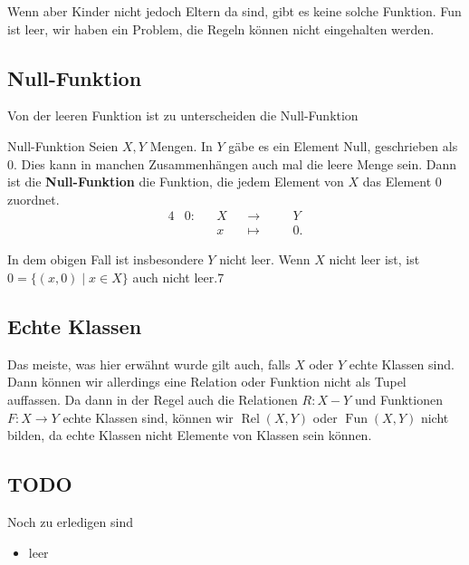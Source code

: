 \documentclass[a4paper]{amsart}
\theoremstyle{definition}
\begin{document}
Wenn aber Kinder nicht jedoch Eltern da sind, gibt es keine solche Funktion. Fun ist leer, wir haben ein Problem, die Regeln können nicht eingehalten werden.

\subsection*{Null-Funktion}
Von der leeren Funktion ist zu unterscheiden die Null-Funktion
\begin{Definition}{Null-Funktion}
   Seien $X, Y$ Mengen. In $Y$ gäbe es ein Element Null, geschrieben als $0$. Dies kann in manchen Zusammenhängen auch mal die leere Menge sein. Dann ist die \textbf{Null-Funktion} die Funktion, die jedem Element von $X$ das Element $0$ zuordnet.
   \begin{alignat}{4}
      &0 \colon &&X &&\to     &&\quad Y\\
      &         &&x &&\mapsto &&\quad 0.
   \end{alignat}
\end{Definition}
In dem obigen Fall ist insbesondere $Y$ nicht leer. Wenn $X$ nicht leer ist, ist $0 = \{(x,0) \mid x \in X \}$ auch nicht leer.7

\subsection*{Echte Klassen}
Das meiste, was hier erwähnt wurde gilt auch, falls $X$ oder $Y$ echte Klassen sind. Dann können wir allerdings eine Relation oder Funktion nicht als Tupel auffassen. Da dann in der Regel auch die Relationen $R \colon X-Y$  und Funktionen $F \colon X \to Y$ echte Klassen sind, können wir $\operatorname{Rel}(X,Y)$ oder $\operatorname{Fun}(X,Y)$ nicht bilden, da echte Klassen nicht Elemente von Klassen sein können.

\begin{backup}
\section{TODO}
Noch zu erledigen sind
\begin{itemize}
   \item leer
\end{itemize}
\end{backup}
\end{document}
